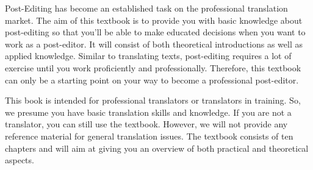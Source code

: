 
Post-Editing has become an established task on the professional translation market. The aim of this textbook is to provide you with basic knowledge about post-editing so that you’ll be able to make educated decisions when you want to work as a post-editor. It will consist of both theoretical introductions as well as applied knowledge. Similar to translating texts, post-editing requires a lot of exercise until you work proficiently and professionally. Therefore, this textbook can only be a starting point on your way to become a professional post-editor.



This book is intended for professional translators or translators in training. So, we presume you have basic translation skills and knowledge. If you are not a translator, you can still use the textbook. However, we will not provide any reference material for general translation issues.
The textbook consists of ten chapters and will aim at giving you an overview of both practical and theoretical aspects.
